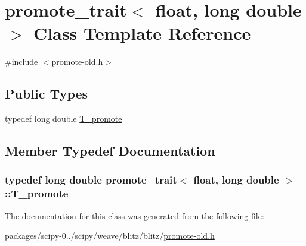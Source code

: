 \hypertarget{classpromote__trait_3_01float_00_01long_01double_01_4}{}\section{promote\+\_\+trait$<$ float, long double $>$ Class Template Reference}
\label{classpromote__trait_3_01float_00_01long_01double_01_4}


{\ttfamily \#include $<$promote-\/old.\+h$>$}

\subsection*{Public Types}
\begin{DoxyCompactItemize}
\item 
typedef long double \hyperlink{classpromote__trait_3_01float_00_01long_01double_01_4_a2b944cd6d362f70f93ec8d5a056e87de}{T\+\_\+promote}
\end{DoxyCompactItemize}


\subsection{Member Typedef Documentation}
\hypertarget{classpromote__trait_3_01float_00_01long_01double_01_4_a2b944cd6d362f70f93ec8d5a056e87de}{}
\subsubsection[{T\+\_\+promote}]{\setlength{\rightskip}{0pt plus 5cm}typedef long double {\bf promote\+\_\+trait}$<$ float, long double $>$\+::{\bf T\+\_\+promote}}\label{classpromote__trait_3_01float_00_01long_01double_01_4_a2b944cd6d362f70f93ec8d5a056e87de}


The documentation for this class was generated from the following file\+:\begin{DoxyCompactItemize}
\item 
packages/scipy-\/0../scipy/weave/blitz/blitz/\hyperlink{promote-old_8h}{promote-\/old.\+h}\end{DoxyCompactItemize}
